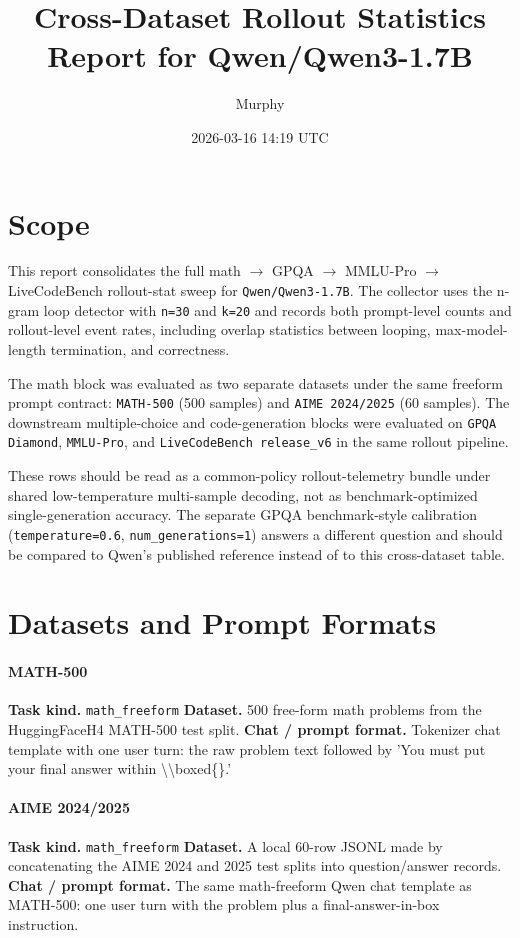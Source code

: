 \documentclass[11pt]{article}
\title{Cross-Dataset Rollout Statistics Report for Qwen/Qwen3-1.7B}
\author{Murphy}
\date{2026-03-16 14:19 UTC}
\begin{document}
\maketitle

\section*{Scope}
This report consolidates the full math $\rightarrow$ GPQA $\rightarrow$ MMLU-Pro $\rightarrow$ LiveCodeBench rollout-stat sweep for \texttt{Qwen/Qwen3-1.7B}. The collector uses the n-gram loop detector with \texttt{n=30} and \texttt{k=20} and records both prompt-level counts and rollout-level event rates, including overlap statistics between looping, max-model-length termination, and correctness.

The math block was evaluated as two separate datasets under the same freeform prompt contract: \texttt{MATH-500} (500 samples) and \texttt{AIME 2024/2025} (60 samples). The downstream multiple-choice and code-generation blocks were evaluated on \texttt{GPQA Diamond}, \texttt{MMLU-Pro}, and \texttt{LiveCodeBench release\_v6} in the same rollout pipeline.

These rows should be read as a common-policy rollout-telemetry bundle under shared low-temperature multi-sample decoding, not as benchmark-optimized single-generation accuracy. The separate GPQA benchmark-style calibration (\texttt{temperature=0.6}, \texttt{num\_generations=1}) answers a different question and should be compared to Qwen's published reference instead of to this cross-dataset table.

\section*{Datasets and Prompt Formats}
\paragraph{MATH-500}
\textbf{Task kind.} \texttt{math\_freeform}
\textbf{Dataset.} 500 free-form math problems from the HuggingFaceH4 MATH-500 test split.
\textbf{Chat / prompt format.} Tokenizer chat template with one user turn: the raw problem text followed by 'You must put your final answer within \textbackslash{}\textbackslash{}boxed\{\}.'

\paragraph{AIME 2024/2025}
\textbf{Task kind.} \texttt{math\_freeform}
\textbf{Dataset.} A local 60-row JSONL made by concatenating the AIME 2024 and 2025 test splits into question/answer records.
\textbf{Chat / prompt format.} The same math-freeform Qwen chat template as MATH-500: one user turn with the problem plus a final-answer-in-box instruction.
\end{document}
